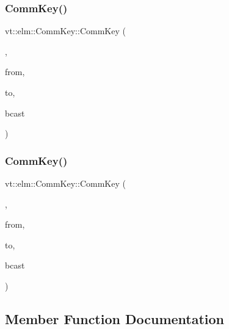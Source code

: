 \subsubsection{\texorpdfstring{Comm\+Key()}{CommKey()}\hspace{0.1cm}{\footnotesize\ttfamily [6/7]}}
{\footnotesize\ttfamily vt\+::elm\+::\+Comm\+Key\+::\+Comm\+Key (\begin{DoxyParamCaption}\item[{\hyperlink{structvt_1_1elm_1_1_comm_key_1_1_collection_to_node_tag}{Collection\+To\+Node\+Tag}}]{,  }\item[{\hyperlink{structvt_1_1elm_1_1_element_i_d_struct}{Element\+I\+D\+Struct}}]{from,  }\item[{\hyperlink{namespacevt_a866da9d0efc19c0a1ce79e9e492f47e2}{Node\+Type}}]{to,  }\item[{bool}]{bcast }\end{DoxyParamCaption})\hspace{0.3cm}{\ttfamily [inline]}}

\mbox{\label{structvt_1_1elm_1_1_comm_key_ac7803fe0fe9642f2f34eb474b61c17da}} 
\subsubsection{\texorpdfstring{Comm\+Key()}{CommKey()}\hspace{0.1cm}{\footnotesize\ttfamily [7/7]}}
{\footnotesize\ttfamily vt\+::elm\+::\+Comm\+Key\+::\+Comm\+Key (\begin{DoxyParamCaption}\item[{\hyperlink{structvt_1_1elm_1_1_comm_key_1_1_node_to_collection_tag}{Node\+To\+Collection\+Tag}}]{,  }\item[{\hyperlink{namespacevt_a866da9d0efc19c0a1ce79e9e492f47e2}{Node\+Type}}]{from,  }\item[{\hyperlink{structvt_1_1elm_1_1_element_i_d_struct}{Element\+I\+D\+Struct}}]{to,  }\item[{bool}]{bcast }\end{DoxyParamCaption})\hspace{0.3cm}{\ttfamily [inline]}}



\subsection{Member Function Documentation}
\mbox{\label{structvt_1_1elm_1_1_comm_key_a23b4e6a59e39eac8a5e631496e6cd618}} 
